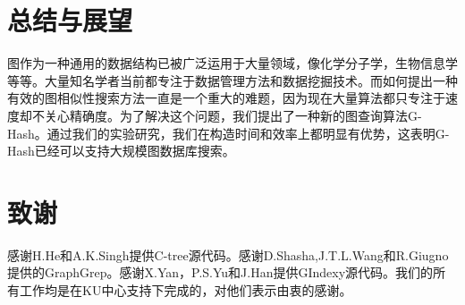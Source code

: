 \documentclass{article}
\begin{document}
\else

\fi
\section{总结与展望}
图作为一种通用的数据结构已被广泛运用于大量领域，像化学分子学，生物信息学等等。大量知名学者当前都专注于数据管理方法和数据挖掘技术。而如何提出一种有效的图相似性搜索方法一直是一个重大的难题，因为现在大量算法都只专注于速度却不关心精确度。为了解决这个问题，我们提出了一种新的图查询算法G-Hash。通过我们的实验研究，我们在构造时间和效率上都明显有优势，这表明G-Hash已经可以支持大规模图数据库搜索。
\section{致谢}
感谢H.He和A.K.Singh提供C-tree源代码。感谢D.Shasha,J.T.L.Wang和R.Giugno提供的GraphGrep。感谢X.Yan，P.S.Yu和J.Han提供GIndexy源代码。我们的所有工作均是在KU中心支持下完成的，对他们表示由衷的感谢。
\ifx\allfiles\undefined
%
%
\end{document}
